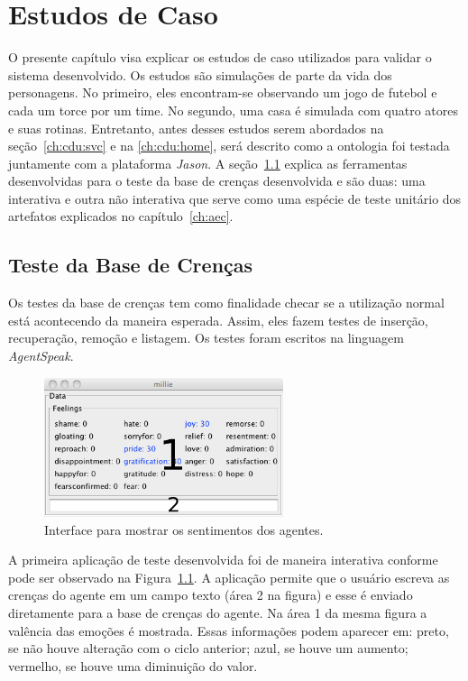 \chapter{Estudos de Caso} \label{ch:cdu}

O presente capítulo visa explicar os estudos de caso utilizados para validar o
sistema desenvolvido. Os estudos são simulações de parte da vida dos
personagens. No primeiro, eles encontram-se observando um jogo de futebol e
cada um torce por um time. No segundo, uma casa é simulada com quatro atores
e suas rotinas. Entretanto, antes desses estudos serem abordados na
seção~\ref{ch:cdu:svc} e na \ref{ch:cdu:home},
será descrito como a ontologia foi testada juntamente com a plataforma
\emph{Jason}. A seção~\ref{ch:cdu:tbc} explica as ferramentas desenvolvidas
para o teste da base de crenças desenvolvida e são duas:
uma interativa e outra não interativa que serve como uma espécie de teste
unitário dos artefatos explicados no capítulo~\ref{ch:aec}.

\section{Teste da Base de Crenças} \label{ch:cdu:tbc}

Os testes da base de crenças tem como finalidade checar se a utilização normal
está acontecendo da maneira esperada. Assim, eles fazem testes de inserção,
recuperação, remoção e listagem. Os testes foram escritos na linguagem
\emph{AgentSpeak}.

\begin{figure}
	\begin{center}
		\includegraphics[width=70mm]{figuras/introductionDF.png}
	\end{center}
	\caption{Interface para mostrar os sentimentos dos agentes.}
	\label{fig:introducaoDF}
\end{figure}

A primeira aplicação de teste desenvolvida foi de maneira interativa conforme
pode ser observado na Figura~\ref{fig:introducaoDF}. A aplicação permite que o
usuário escreva as crenças do agente em um campo texto (área 2 na figura) e
esse é enviado diretamente para a base de crenças do agente. Na área 1 da mesma
figura a valência das emoções é mostrada.
Essas informações podem aparecer em: preto, se não houve alteração com o ciclo
anterior; azul, se houve um aumento; vermelho, se houve uma diminuição do
valor.

